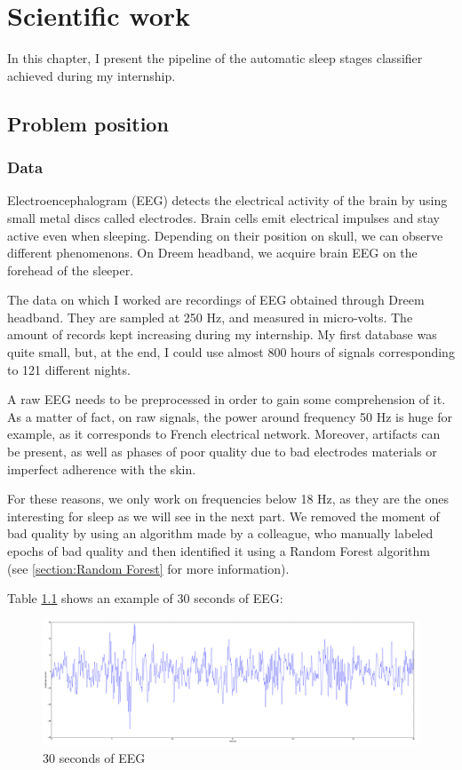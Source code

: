 \documentclass[12pt]{report}
\begin{document}
\chapter{Scientific work} \label{chap:Scientific work}

In this chapter, I present the pipeline of the automatic sleep stages classifier achieved during my internship.

\section{Problem position}

\subsection{Data}

Electroencephalogram (EEG) detects the electrical activity of the brain by using small metal discs called electrodes. Brain cells emit electrical impulses and stay active even when sleeping. Depending on their position on skull, we can observe different phenomenons. On Dreem headband, we acquire brain EEG on the forehead of the sleeper.

The data on which I worked are recordings of EEG obtained through Dreem headband. They are sampled at 250 Hz, and measured in micro-volts. The amount of records kept increasing during my internship. My first database was quite small, but, at the end, I could use almost 800 hours of signals corresponding to 121 different nights.

A raw EEG needs to be preprocessed in order to gain some comprehension of it. As a matter of fact, on raw signals, the power around frequency 50 Hz is huge for example, as it corresponds to French electrical network. Moreover, artifacts can be present, as well as phases of poor quality due to bad electrodes materials or imperfect adherence with the skin.

For these reasons, we only work on frequencies below 18 Hz, as they are the ones interesting for sleep as we will see in the next part. We removed the moment of bad quality by using an algorithm made by a colleague, who manually labeled epochs of bad quality and then identified it using a Random Forest algorithm (see \ref{section:Random Forest} for more information).

Table \ref{fig:eeg_30s} shows an example of 30 seconds of EEG:

\begin{figure}[H]
\centering
\includegraphics[width=1\textwidth]{img/chap2/eeg_30s.png}
\caption{\label{fig:eeg_30s}30 seconds of EEG}
\end{figure}
\end{document}
